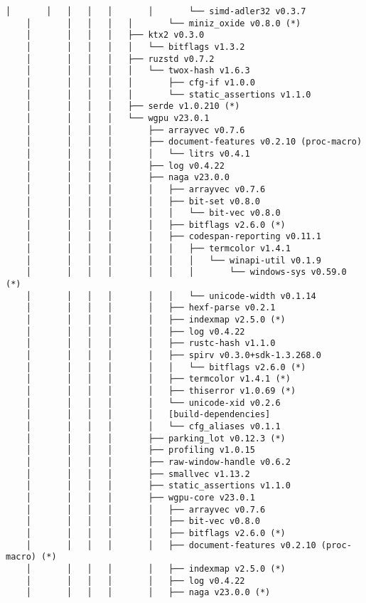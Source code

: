 \begin{lstlisting}[style=mystyle, caption={dependencias del proyecto}, label={lst:dependencias}]
    │       │   │   │   │       │       └── simd-adler32 v0.3.7
    │       │   │   │   │       └── miniz_oxide v0.8.0 (*)
    │       │   │   │   ├── ktx2 v0.3.0
    │       │   │   │   │   └── bitflags v1.3.2
    │       │   │   │   ├── ruzstd v0.7.2
    │       │   │   │   │   └── twox-hash v1.6.3
    │       │   │   │   │       ├── cfg-if v1.0.0
    │       │   │   │   │       └── static_assertions v1.1.0
    │       │   │   │   ├── serde v1.0.210 (*)
    │       │   │   │   └── wgpu v23.0.1
    │       │   │   │       ├── arrayvec v0.7.6
    │       │   │   │       ├── document-features v0.2.10 (proc-macro)
    │       │   │   │       │   └── litrs v0.4.1
    │       │   │   │       ├── log v0.4.22
    │       │   │   │       ├── naga v23.0.0
    │       │   │   │       │   ├── arrayvec v0.7.6
    │       │   │   │       │   ├── bit-set v0.8.0
    │       │   │   │       │   │   └── bit-vec v0.8.0
    │       │   │   │       │   ├── bitflags v2.6.0 (*)
    │       │   │   │       │   ├── codespan-reporting v0.11.1
    │       │   │   │       │   │   ├── termcolor v1.4.1
    │       │   │   │       │   │   │   └── winapi-util v0.1.9
    │       │   │   │       │   │   │       └── windows-sys v0.59.0 (*)
    │       │   │   │       │   │   └── unicode-width v0.1.14
    │       │   │   │       │   ├── hexf-parse v0.2.1
    │       │   │   │       │   ├── indexmap v2.5.0 (*)
    │       │   │   │       │   ├── log v0.4.22
    │       │   │   │       │   ├── rustc-hash v1.1.0
    │       │   │   │       │   ├── spirv v0.3.0+sdk-1.3.268.0
    │       │   │   │       │   │   └── bitflags v2.6.0 (*)
    │       │   │   │       │   ├── termcolor v1.4.1 (*)
    │       │   │   │       │   ├── thiserror v1.0.69 (*)
    │       │   │   │       │   └── unicode-xid v0.2.6
    │       │   │   │       │   [build-dependencies]
    │       │   │   │       │   └── cfg_aliases v0.1.1
    │       │   │   │       ├── parking_lot v0.12.3 (*)
    │       │   │   │       ├── profiling v1.0.15
    │       │   │   │       ├── raw-window-handle v0.6.2
    │       │   │   │       ├── smallvec v1.13.2
    │       │   │   │       ├── static_assertions v1.1.0
    │       │   │   │       ├── wgpu-core v23.0.1
    │       │   │   │       │   ├── arrayvec v0.7.6
    │       │   │   │       │   ├── bit-vec v0.8.0
    │       │   │   │       │   ├── bitflags v2.6.0 (*)
    │       │   │   │       │   ├── document-features v0.2.10 (proc-macro) (*)
    │       │   │   │       │   ├── indexmap v2.5.0 (*)
    │       │   │   │       │   ├── log v0.4.22
    │       │   │   │       │   ├── naga v23.0.0 (*)

\end{lstlisting}
